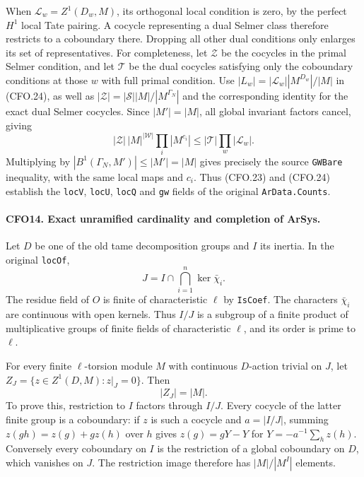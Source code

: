 When $\mathcal L_w=Z^1(D_w,M)$, its orthogonal local
condition is zero, by the perfect $H^1$ local Tate pairing.
A cocycle representing a dual Selmer class therefore
restricts to a coboundary there.  Dropping all other dual
conditions only enlarges its set of representatives.
For completeness, let $\mathscr Z$ be the cocycles in
the primal Selmer condition, and let $\mathscr T$ be
the dual cocycles satisfying only the coboundary
conditions at those $w$ with full primal condition.
Use $|L_w|=|\mathcal L_w||M^{D_w}|/|M|$ in (CFO.24),
as well as $|\mathscr Z|=|\mathscr S||M|/|M^{\Gamma_N}|$
and the corresponding identity for the exact dual
Selmer cocycles.  Since $|M'|=|M|$, all global
invariant factors cancel, giving
\[
 |\mathscr Z|\,|M|^{|\mathcal W|}
       \prod_i|M^{c_i}|
 \le |\mathscr T|\prod_w|\mathcal L_w|.
 \]
Multiplying by $|B^1(\Gamma_N,M')|\le |M'|=|M|$
gives precisely the source \texttt{GWBare} inequality,
with the same local maps and $c_i$.
Thus (CFO.23) and (CFO.24) establish the
\texttt{locV}, \texttt{locU}, \texttt{locQ} and
\texttt{gw} fields of the original \texttt{ArData.Counts}.

\paragraph{CFO14. Exact unramified cardinality and completion of ArSys.}
\label{claim:CFO14}
Let $D$ be one of the old tame decomposition groups and
$I$ its inertia.  In the original \texttt{locOf},
\[
 J=I\cap\bigcap_{i=1}^{n}\ker\bar\chi_i.                          \tag{CFO.25}
\]
The residue field of $O$ is finite of characteristic $\ell$
by \texttt{IsCoef}.  The characters $\bar\chi_i$ are
continuous with open kernels.  Thus $I/J$ is a subgroup
of a finite product of multiplicative groups of finite
fields of characteristic $\ell$, and its order is prime
to $\ell$.

For every finite $\ell$-torsion module $M$ with continuous
$D$-action trivial on $J$, let
$Z_J=\{z\in Z^1(D,M):z|_J=0\}$.  Then
\[
                         |Z_J|=|M|.                            \tag{CFO.26}
\]
To prove this, restriction to $I$ factors through $I/J$.
Every cocycle of the latter finite group is a coboundary:
if $z$ is such a cocycle and $a=|I/J|$, summing
$z(gh)=z(g)+g z(h)$ over $h$ gives
$z(g)=gY-Y$ for $Y=-a^{-1}\sum_h z(h)$.
Conversely every coboundary on $I$ is the restriction of
a global coboundary on $D$, which vanishes on $J$.
The restriction image therefore has
$|M|/|M^I|$ elements.

